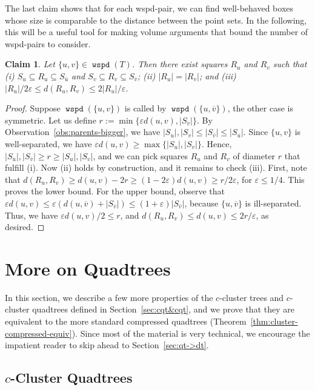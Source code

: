 \documentclass[11pt]{paper}
\newcommand {\eps} {\varepsilon}
\newcommand {\eqdef} {:=}
\DeclareMathOperator {\wspd}{\texttt{wspd}}
\newtheorem {claim}[theorem] {Claim}
\begin{document}
   The last claim shows that for each wspd-pair, we can find
   well-behaved boxes whose size is comparable to the distance
   between the point sets. In the following, this will be a useful tool
   for making volume arguments that bound the number of wspd-pairs to consider.
\begin{claim}\label{clm:quad-squares}
Let \emph{$\{u,v\} \in \wspd(T)$}.
Then there exist squares $R_u$ and $R_v$ such that
(i) $S_u \subseteq R_u \subseteq S_{\overline{u}}$ and
    $S_v \subseteq R_v \subseteq S_{\overline{v}}$;
(ii) $|R_u| =  |R_v|$;
and (iii) $|R_u|/2\eps \leq d(R_u,R_v) \leq 2|R_u|/\eps$.
\end{claim}

\begin{proof}
Suppose $\wspd(\{u,v\})$ is called by
$\wspd(\{u, \overline{v}\})$, the other case is symmetric.
Let us define $r \eqdef \min\{\eps d(u,v), |S_{\overline{v}}|\}$.
By Observation~\ref{obs:parents-bigger},
we have $|S_u|,|S_v| \leq |S_{\overline{v}}| \leq |S_{\overline{u}}|$.
 Since $\{u,v\}$
is well-separated, we have $\eps d(u,v) \geq \max\{|S_u|, |S_v|\}$.
Hence, $|S_{\overline{u}}|, |S_{\overline{v}}| \geq r \geq |S_u|, |S_v|$,
and we can pick squares $R_u$ and $R_v$ of diameter $r$ that fulfill (i).
Now (ii) holds by construction, and it remains to check (iii).
First, note that $d(R_u, R_v) \geq d(u,v) - 2r
\geq (1-2\eps) d(u,v) \geq r/2\eps$, for $\eps \leq 1/4$. This
proves the lower bound.
For the upper bound, observe that
$\eps d(u,v) \leq \eps(d(u,\overline{v})+|S_{\overline{v}}|)
\leq (1+\eps)|S_{\overline{v}}|$, because $\{u,\overline{v}\}$
is ill-separated. Thus, we have $\eps d(u,v)/2 \leq r$,
and $d(R_u, R_v) \leq d(u,v) \leq 2r/\eps$, as desired.
\end{proof}

    

\section{More on Quadtrees} \label {sec:qt}


  In this section, we describe a few more properties of the $c$-cluster
  trees and $c$-cluster quadtrees defined in Section~\ref{sec:cqt&cqt}, 
  and we prove that they are equivalent to the more standard compressed
  quadtrees (Theorem~\ref {thm:cluster-compressed-equiv}).
  Since most of the material is very technical, we encourage 
  the impatient reader to skip ahead to Section~\ref {sec:qt->dt}.

  \subsection {$c$-Cluster Quadtrees} \label {sec:ccqt}
\end{document}

